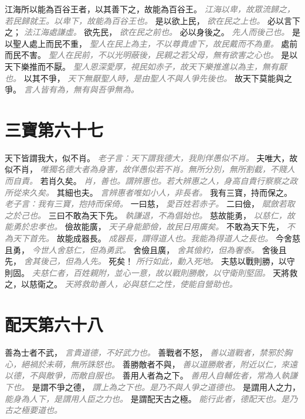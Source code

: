 \documentclass[a4paper,zihao=-4,oneside,landscape,UTF8]{ctexart}
\newcommand{\zhushi}[1]{\scriptsize{\textit{\textcolor{gray}{#1}}}\normalsize}
\begin{document}
江海所以能為百谷王者，以其善下之，故能為百谷王。
\zhushi{江海以卑，故眾流歸之，若民歸就王。以卑下，故能為百谷王也。}
是以欲上民，
\zhushi{欲在民之上也。}
必以言下之；
\zhushi{法江海處謙虛。}
欲先民，
\zhushi{欲在民之前也。}
必以身後之。
\zhushi{先人而後己也。}
是以聖人處上而民不重，
\zhushi{聖人在民上為主，不以尊貴虐下，故民戴而不為重。}
處前而民不害。
\zhushi{聖人在民前，不以光明蔽後，民親之若父母，無有欲害之心也。}
是以天下樂推而不厭。
\zhushi{聖人恩深愛厚，視民如赤子，故天下樂推進以為主，無有厭也。}
以其不爭，
\zhushi{天下無厭聖人時，是由聖人不與人爭先後也。}
故天下莫能與之爭。
\zhushi{言人皆有為，無有與吾爭無為。}


\section{三寶第六十七}

天下皆謂我大，似不肖。
\zhushi{老子言：天下謂我德大，我則佯愚似不肖。}
夫唯大，故似不肖，
\zhushi{唯獨名德大者為身害，故佯愚似若不肖。無所分別，無所割截，不賤人而自責。}
若肖久矣。
\zhushi{肖，善也。謂辨惠也。若大辨惠之人，身高自貴行察察之政所從來久矣。}
其細也夫。
\zhushi{言辨惠者唯如小人，非長者。}
我有三寶，持而保之。
\zhushi{老子言：我有三寶，抱持而保倚。}
一曰慈，
\zhushi{愛百姓若赤子。}
二曰儉，
\zhushi{賦斂若取之於己也。}
三曰不敢為天下先。
\zhushi{執謙退，不為倡始也。}
慈故能勇，
\zhushi{以慈仁，故能勇於忠孝也。}
儉故能廣，
\zhushi{天子身能節儉，故民日用廣矣。}
不敢為天下先，
\zhushi{不為天下首先。}
故能成器長。
\zhushi{成器長，謂得道人也。我能為得道人之長也。}
今舍慈且勇，
\zhushi{今世人舍慈仁，但為勇武。}
舍儉且廣，
\zhushi{舍其儉約，但為奢泰。}
舍後且先，
\zhushi{舍其後己，但為人先。}
死矣！
\zhushi{所行如此，動入死地。}
夫慈以戰則勝，以守則固。
\zhushi{夫慈仁者，百姓親附，並心一意，故以戰則勝敵，以守衛則堅固。}
天將救之，以慈衛之。
\zhushi{天將救助善人，必與慈仁之性，使能自營助也。}


\section{配天第六十八}

善為士者不武，
\zhushi{言貴道德，不好武力也。}
善戰者不怒，
\zhushi{善以道戰者，禁邪於胸心，絕禍於未萌，無所誅怒也。}
善勝敵者不與，
\zhushi{善以道勝敵者，附近以仁，來遠以德，不與敵爭，而敵自服也。}
善用人者為之下。
\zhushi{善用人自輔佐者，常為人執謙下也。}
是謂不爭之德，
\zhushi{謂上為之下也。是乃不與人爭之道德也。}
是謂用人之力，
\zhushi{能身為人下，是謂用人臣之力也。}
是謂配天古之極。
\zhushi{能行此者，德配天也。是乃古之極要道也。}
\end{document}
